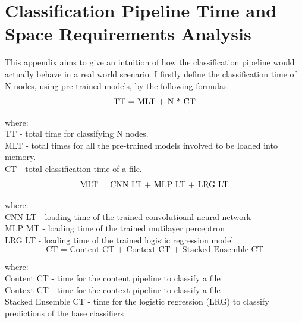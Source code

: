  

\chapter{Classification Pipeline Time and Space Requirements Analysis} 

This appendix aims to give an intuition of how the classification pipeline would actually behave in a real world scenario. I firstly define the classification time of N nodes, using pre-trained models, by the following formulas: \\

    \begin{equation}
        \centering
        \text{TT = MLT  + N * CT}
    \end{equation}
    
    where: \\
    TT - total time for classifying N nodes. \\
    MLT - total times for all the pre-trained models involved to be loaded into memory. \\
    CT - total classification time of a file. \\
    
    \begin{equation}
        \centering
        \text{MLT = CNN LT + MLP LT + LRG LT} 
    \end{equation}
    
    where: \\
    CNN LT - loading time of the trained convolutioanl neural network \\
    MLP MT - loading time of the trained mutilayer perceptron \\
    LRG LT - loading time of the trained logistic regression model \\
    
    \begin{equation}
        \text{CT = Content CT + Context CT + Stacked Ensemble CT}
    \end{equation} \label{CT}
    
    where: \\
    Content CT - time for the content pipeline to classify a file \\
    Context CT - time for the context pipeline to classify a file \\
    Stacked Ensemble CT - time for the logistic regression (LRG) to classify predictions of the base classifiers \\
    
